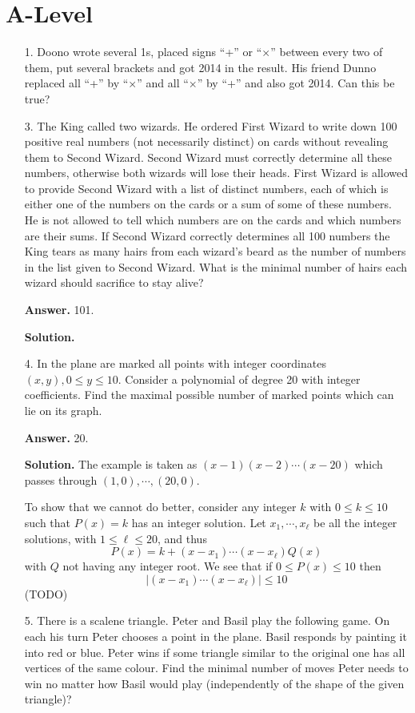 \documentclass[11pt,a4paper]{article}
\begin{document}
\section*{A-Level}
\begin{enumerate}
	\item[1.]
	Doono wrote several 1s, placed signs ``+'' or ``$\times$'' between every two of them, put
	several brackets and got 2014 in the result. His friend Dunno replaced all ``+'' by ``$\times$''
	and all ``$\times$'' by ``+'' and also got 2014. Can this be true?
	
	\item[3.]The King called two wizards. He ordered First Wizard to write down 100 positive real
	numbers (not necessarily distinct) on cards without revealing them to Second Wizard.
	Second Wizard must correctly determine all these numbers, otherwise both wizards
	will lose their heads. First Wizard is allowed to provide Second Wizard with a list of
	distinct numbers, each of which is either one of the numbers on the cards or a sum of
	some of these numbers. He is not allowed to tell which numbers are on the cards and
	which numbers are their sums. If Second Wizard correctly determines all 100 numbers
	the King tears as many hairs from each wizard’s beard as the number of numbers in
	the list given to Second Wizard. What is the minimal number of hairs each wizard
	should sacrifice to stay alive?
	
	\textbf{Answer.} 101. 
	
	\textbf{Solution.} 
	
	\item[4.]
	In the plane are marked all points with integer coordinates $(x, y), 0 \le y \le 10$. Consider
	a polynomial of degree 20 with integer coefficients. Find the maximal possible number
	of marked points which can lie on its graph.
	
	\textbf{Answer.} 20. 
	
	\textbf{Solution.} The example is taken as $(x-1)(x-2)\cdots (x-20)$ which passes through $(1, 0), \cdots, (20, 0)$. 
	
	To show that we cannot do better, consider any integer $k$ with $0\le k\le 10$ such that $P(x)=k$ has an integer solution. 
	Let $x_1, \cdots, x_{\ell}$ be all the integer solutions, with $1\le\ell\le 20$, and thus 
	\[
	P(x)=k+(x-x_1)\cdots (x-x_{\ell})Q(x)
	\]
	with $Q$ not having any integer root. We see that if $0\le P(x)\le 10$ then 
	\[
	|(x-x_1)\cdots (x-x_{\ell})|\le 10
	\]
	(TODO)
	
	\item[5.]
	There is a scalene triangle. Peter and Basil play the following game. On each his
	turn Peter chooses a point in the plane. Basil responds by painting it into red or
	blue. Peter wins if some triangle similar to the original one has all vertices of the same
	colour. Find the minimal number of moves Peter needs to win no matter how Basil
	would play (independently of the shape of the given triangle)?
	

\end{enumerate}
\end{document}
